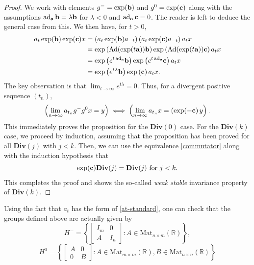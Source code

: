 \documentclass[reqno,11pt]{amsart}
\theoremstyle{plain}
\theoremstyle{definition}
\theoremstyle{remark}
\numberwithin{equation}{section}
\newcommand{\D}{\mathbf{Div}}
\newcommand{\ad}{\operatorname{ad}}
\newcommand{\Ad}{\operatorname{Ad}}
\newcommand{\R}{{\mathbb{R}}}
\newcommand{\va}{{\bf a}}
\newcommand{\vb}{{\bf b}}
\newcommand{\vc}{{\bf c}}
\begin{document}
\begin{proof}
We work with elements $g^- = \exp(\vb)$ and $g^0= \exp(\vc)$ along with the assumptions $\ad_\va \vb = \lambda \vb$ for $\lambda <0$ and $\ad_\va \vc =0$. 
The reader is left to deduce the general case from this.
We then have, for $t>0$, 
\begin{equation}
\begin{split}
    a_t\exp(\vb)\exp(\vc)x &=  \left(a_t\exp(\vb) a_{-t}\right) \left( a_t \exp(\vc) a_{-t}\right) a_t x\\
    &= \exp\left(\Ad(\exp(t\va))\vb\right) \exp\left(\Ad(\exp(t\va))\vc\right) a_t x\\
    &= \exp\left(e^{t\ad_\va}\vb\right) \exp\left( e^{t\ad_{\va}}\vc\right) a_t x \\
    &= \exp\left(e^{t\lambda}\vb\right) \exp\left(\vc\right) a_t x.
    \end{split}
\end{equation}
The key observation is that $\lim_{t \to \infty}e^{t\lambda} = 0$.
Thus, for a divergent positive sequence $({t_n})$,
\begin{equation}\label{commutator}
    \left(\lim_{n\to\infty}a_{t_n} g^- g^0 x = y\right) \iff \left(\lim_{n\to \infty}a_{t_n} x = \left(\exp(-\vc\right)y\right).
\end{equation}
This immediately proves the proposition for the $\D(0)$ case.
For the $\D(k)$ case, we proceed by induction, assuming that the proposition has been proved for all $\D(j)$ with $j<k$.
Then, we can use the equivalence \eqref{commutator} along with the induction hypothesis that
\begin{equation*}
    \exp(\vc) \D(j) = \D(j) \text{ for } j<k.
\end{equation*}
This completes the proof and shows the so-called \textit{weak stable}
invariance property of $\D(k)$.
\end{proof}
Using the fact that $a_t$ has the form of \eqref{at-standard}, one can check that the groups defined above are actually given by
\begin{equation*}
    H^- = \left\lbrace  \left[ {\begin{array}{cc}
   I_m & 0  \\
   A & I_n 
  \end{array} } \right] : A \in \text{Mat}_{n\times m}(\R)\right\rbrace, 
\end{equation*}
\begin{equation*}
    H^0 = \left\lbrace  \left[ {\begin{array}{cc}
   A & 0  \\
   0 & B 
  \end{array} } \right] : A \in \text{Mat}_{m\times m}(\R), B \in \text{Mat}_{n \times n}(\R)\right\rbrace
\end{equation*}
\end{document}
